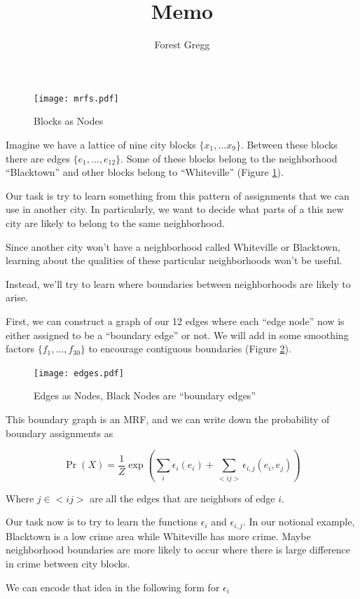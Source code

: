 \documentclass{article}
\title{Memo}
\author{Forest Gregg}
\begin{document}
\begin{figure}
\centering
\texttt{[image: mrfs.pdf]}
\caption{Blocks as Nodes}
\label{fig:neighborhoods}
\end{figure}

Imagine we have a lattice of nine city blocks
$\{x_1,...x_9\}$. Between these blocks there are edges
$\{e_1,...,e_{12}\}$. Some of these blocks belong to the neighborhood
``Blacktown'' and other blocks belong to ``Whiteville'' (Figure
\ref{fig:neighborhoods}). 

Our task is try to learn something from this pattern of assignments
that we can use in another city. In particularly, we want to decide
what parts of a this new city are likely to belong to the same
neighborhood.

Since another city won't have a neighborhood called Whiteville or
Blacktown, learning about the qualities of these particular
neighborhoods won't be useful.

Instead, we'll try to learn where boundaries between neighborhoods are
likely to arise. 

First, we can construct a graph of our 12 edges where each ``edge
node'' now is either assigned to be a ``boundary edge'' or not. We
will add in some smoothing factors $\{f_1,...,f_{30}\}$ to encourage
contiguous boundaries (Figure \ref{fig:edges}).

\begin{figure}
\centering
\texttt{[image: edges.pdf]}
\caption{Edges as Nodes, Black Nodes are ``boundary edges''}
\label{fig:edges}
\end{figure}

This boundary graph is an MRF, and we can write down the probability of boundary assignments as 

\begin{equation}
\Pr(X) = \frac{1}{Z}\operatorname{exp}(\sum_i\epsilon_i(e_i) + \sum_{<i j>}\epsilon_{i,j}(e_i,e_j)) 
\end{equation}

Where $j \in <i j>$ are all the edges that are neighbors of edge $i$.

Our task now is to try to learn the functions $\epsilon_i$ and
$\epsilon_{i,j}$. In our notional example, Blacktown is a low crime
area while Whiteville has more crime. Maybe neighborhood boundaries
are more likely to occur where there is large difference in crime
between city blocks.

We can encode that idea in the following form for $\epsilon_i$
\end{document}
